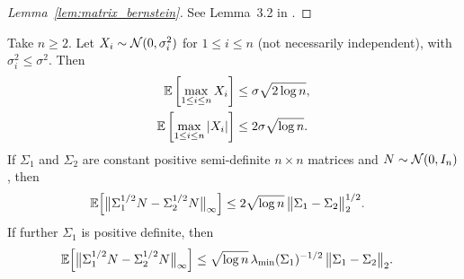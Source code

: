\begin{proof}[Lemma~\ref{lem:matrix_bernstein}]

  See Lemma~3.2 in \citet{minsker2019moment}.
\end{proof}

\begin{lemma}
  \label{lem:gaussian_vector_maximal}

  Take $n \geq 2$.
  Let $X_i \sim \mathcal{N}(0, \sigma_i^2)$
  for $1 \leq i \leq n$
  (not necessarily independent),
  with $\sigma_i^2 \leq \sigma^2$.
  Then
  \begin{align}
    \label{eq:gaussian_vector_maximal}
    \mathbb{E}\left[
      \max_{1 \leq i \leq n}
      X_i
    \right]
    &\leq
    \sigma \sqrt{2 \log n}, \\
    \label{eq:gaussian_vector_maximal_abs}
    \mathbb{E}\left[
      \max_{1 \leq i \leq n}
      |X_i|
    \right]
    &\leq
    2 \sigma \sqrt{\log n}.
  \end{align}
  If $\Sigma_1$ and $\Sigma_2$ are constant
  positive semi-definite $n \times n$ matrices
  and $N \sim \mathcal{N}(0,I_n)$,
  then
  \begin{align}
    \label{eq:gaussian_difference_psd}
    \mathbb{E}\Big[
      \big\|
      \Sigma_1^{1/2} N
      - \Sigma_2^{1/2} N
      \big\|_\infty
      \Big]
    &\leq
    2 \sqrt{\log n} \,
    \big\|
    \Sigma_1 - \Sigma_2
    \big\|_2^{1/2}.
  \end{align}
  If further $\Sigma_1$ is
  positive definite,
  then
  \begin{align}
    \label{eq:gaussian_difference_pd}
    \mathbb{E}\Big[
      \big\|
      \Sigma_1^{1/2} N
      - \Sigma_2^{1/2} N
      \big\|_\infty
      \Big]
    &\leq
    \sqrt{\log n} \,
    \lambda_{\min}(\Sigma_1)^{-1/2} \,
    \big\|
    \Sigma_1 - \Sigma_2
    \big\|_2.
  \end{align}

\end{lemma}

